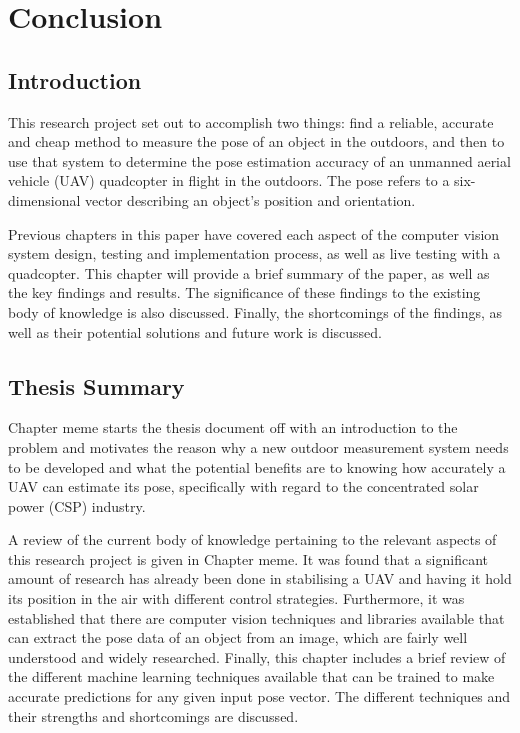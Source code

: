 \chapter{Conclusion}

\section{Introduction}

This research project set out to accomplish two things: find a reliable, accurate and cheap method to measure the pose of an object in the outdoors, and then to use that system to determine the pose estimation accuracy of an unmanned aerial vehicle (UAV) quadcopter in flight in the outdoors. The pose refers to a six-dimensional vector describing an object's position and orientation. 

Previous chapters in this paper have covered each aspect of the computer vision system design, testing and implementation process, as well as live testing with a quadcopter. This chapter will provide a brief summary of the paper, as well as the key findings and results. The significance of these findings to the existing body of knowledge is also discussed. Finally, the shortcomings of the findings, as well as their potential solutions and future work is discussed. 

\section{Thesis Summary}

Chapter meme starts the thesis document off with an introduction to the problem and motivates the reason why a new outdoor measurement system needs to be developed and what the potential benefits are to knowing how accurately a UAV can estimate its pose, specifically with regard to the concentrated solar power (CSP) industry.  

A review of the current body of knowledge pertaining to the relevant aspects of this research project is given in Chapter meme. It was found that a significant amount of research has already been done in stabilising a UAV and having it hold its position in the air with different control strategies. Furthermore, it was established that there are computer vision techniques and libraries available that can extract the pose data of an object from an image, which are fairly well understood and widely researched. Finally, this chapter includes a brief review of the different machine learning techniques available that can be trained to make accurate predictions for any given input pose vector. The different techniques and their strengths and shortcomings are discussed.  

